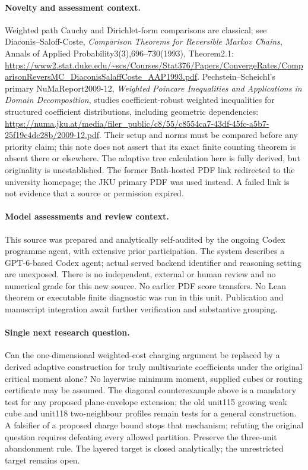 \documentclass[11pt]{article}
\begin{document}
\paragraph{Novelty and assessment context.}
Weighted path Cauchy and Dirichlet-form comparisons are classical; see Diaconis--Saloff-Coste, \emph{Comparison Theorems for Reversible Markov Chains}, Annals of Applied Probability3(3),696--730(1993), Theorem2.1:
\url{https://www2.stat.duke.edu/~scs/Courses/Stat376/Papers/ConvergeRates/ComparisonReversMC_DiaconisSalaffCoste_AAP1993.pdf}.
Pechstein--Scheichl's primary NuMaReport2009-12, \emph{Weighted Poincare Inequalities and Applications in Domain Decomposition}, studies coefficient-robust weighted inequalities for structured coefficient distributions, including geometric dependencies:
\url{https://numa.jku.at/media/filer_public/c8/55/c8554ca7-43df-45fc-a5b7-25f19c4dc28b/2009-12.pdf}.
Their setup and norms must be compared before any priority claim; this note does not assert that its exact finite counting theorem is absent there or elsewhere. The adaptive tree calculation here is fully derived, but originality is unestablished. The former Bath-hosted PDF link redirected to the university homepage; the JKU primary PDF was used instead. A failed link is not evidence that a source or permission expired.

\paragraph{Model assessments and review context.}
This source was prepared and analytically self-audited by the ongoing Codex programme agent, with extensive prior participation. The system describes a GPT-6-based Codex agent; actual served backend identifier and reasoning setting are unexposed. There is no independent, external or human review and no numerical grade for this new source. No earlier PDF score transfers. No Lean theorem or executable finite diagnostic was run in this unit. Publication and manuscript integration await further verification and substantive grouping.

\paragraph{Single next research question.}
Can the one-dimensional weighted-cost charging argument be replaced by a derived adaptive construction for truly multivariate coefficients under the original critical moment alone? No layerwise minimum moment, supplied cubes or routing certificate may be assumed. The diagonal counterexample above is a mandatory test for any proposed plane-envelope extension; the old unit115 growing weak cube and unit118 two-neighbour profiles remain tests for a general construction. A falsifier of a proposed charge bound stops that mechanism; refuting the original question requires defeating every allowed partition. Preserve the three-unit abandonment rule. The layered target is closed analytically; the unrestricted target remains open.
\end{document}
